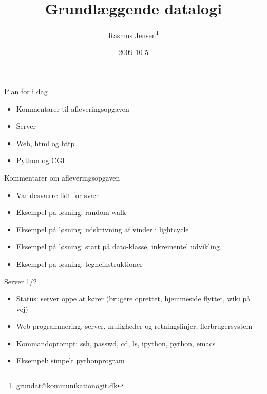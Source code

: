 \documentclass[a4paper,landscape]{slides}
\title{Grundlæggende datalogi}
\author{Rasmus Jensen\footnote{\url{grundat@kommunikationogit.dk}}}
\date{2009-10-5}
\begin{document}
\maketitle

\begin{comment}
 - opsamling/repetition
 - afleveringsopgaven
 - kommandoprompt, ssh, tilgang til server etc.
 - repetition http, introduktion til cgi
 - opsamling om html, forms, strukturerede data
\end{comment}

\begin{slide}
	\begin{center} {\large 
            Plan for i dag
	} \end{center}
	\begin{itemize} \addtolength{\itemsep}{-\baselineskip}
		\item Kommentarer til afleveringsopgaven
		\item Server
		\item Web, html og http
		\item Python og CGI
	\end{itemize}
\end{slide}

\begin{slide}
	\begin{center} {\large 
            Kommentarer om afleveringsopgaven
	} \end{center}
	\begin{itemize} \addtolength{\itemsep}{-\baselineskip}
                \item Var desværre lidt for svær
                \item Eksempel på løsning: random-walk
                \item Eksempel på løsning: udskrivning af vinder i lightcycle
                \item Eksempel på løsning: start på dato-klasse, inkrementel udvikling
                \item Eksempel på løsning: tegneinstruktioner
	\end{itemize}
\end{slide}

\begin{slide}
	\begin{center} {\large 
            Server 1/2
	} \end{center}
	\begin{itemize} \addtolength{\itemsep}{-\baselineskip}
                \item Status: server oppe at kører (brugere oprettet, hjemmeside flyttet, wiki på vej)
                \item Web-programmering, server, muligheder og retningslinjer, flerbrugersystem
                \item Kommandoprompt: ssh, passwd, cd, ls, ipython, python, emacs
                \item Eksempel: simpelt pythonprogram
	\end{itemize}
\end{slide}
\end{document}
